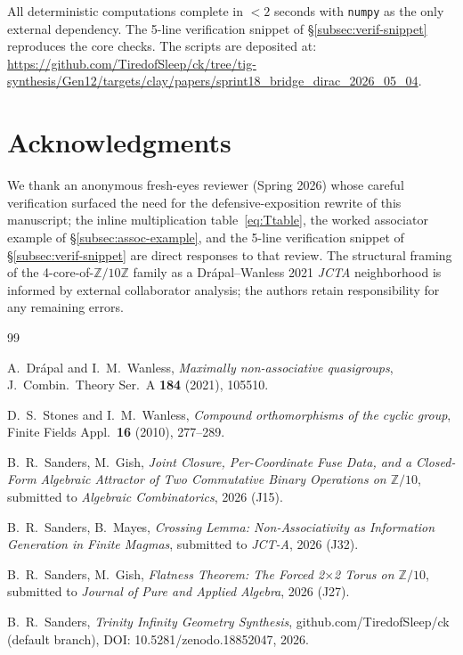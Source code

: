 \documentclass[11pt,reqno]{amsart}
\theoremstyle{plain}
\theoremstyle{definition}
\theoremstyle{remark}
\newcommand{\Z}{\mathbb{Z}}
\begin{document}
All deterministic computations complete in $<2$ seconds with
\texttt{numpy} as the only external dependency. The 5-line
verification snippet of §\ref{subsec:verif-snippet} reproduces the
core checks. The scripts are deposited at:
\url{https://github.com/TiredofSleep/ck/tree/tig-synthesis/Gen12/targets/clay/papers/sprint18_bridge_dirac_2026_05_04}.

\section*{Acknowledgments}

We thank an anonymous fresh-eyes reviewer (Spring 2026) whose careful
verification surfaced the need for the defensive-exposition rewrite of
this manuscript; the inline multiplication table~\eqref{eq:Ttable},
the worked associator example of §\ref{subsec:assoc-example}, and the
5-line verification snippet of §\ref{subsec:verif-snippet} are direct
responses to that review. The structural framing of the
4-core-of-$\Z/10\Z$ family as a Drápal--Wanless 2021 \emph{JCTA}
neighborhood is informed by external collaborator analysis; the
authors retain responsibility for any remaining errors.

\begin{thebibliography}{99}

A.~Drápal and I.~M.~Wanless,
\emph{Maximally non-associative quasigroups},
J.~Combin.~Theory Ser.~A \textbf{184} (2021), 105510.

D.~S.~Stones and I.~M.~Wanless,
\emph{Compound orthomorphisms of the cyclic group},
Finite Fields Appl.\ \textbf{16} (2010), 277--289.

 B.~R.~Sanders, M.~Gish,
\emph{Joint Closure, Per-Coordinate Fuse Data, and a Closed-Form
Algebraic Attractor of Two Commutative Binary Operations on
$\Z/10$}, submitted to \emph{Algebraic Combinatorics}, 2026 (J15).

 B.~R.~Sanders, B.~Mayes,
\emph{Crossing Lemma: Non-Associativity as Information Generation in
Finite Magmas}, submitted to \emph{JCT-A}, 2026 (J32).

 B.~R.~Sanders, M.~Gish,
\emph{Flatness Theorem: The Forced 2$\times$2 Torus on $\Z/10$},
submitted to \emph{Journal of Pure and Applied Algebra}, 2026 (J27).

 B.~R.~Sanders,
\emph{Trinity Infinity Geometry Synthesis},
github.com/TiredofSleep/ck (default branch),
DOI: 10.5281/zenodo.18852047, 2026.

\end{thebibliography}
\end{document}
